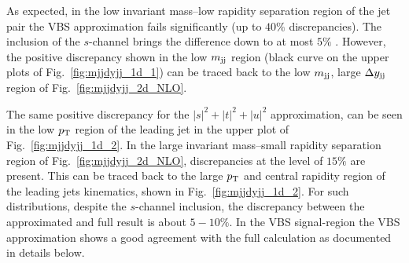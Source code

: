 As expected, in the low invariant mass--low rapidity separation region of the jet pair the VBS approximation fails significantly (up to $40\%$ discrepancies).
The inclusion of the $s$-channel brings the difference down to at most $5\%$ .
However, the positive discrepancy shown in the low $m_{\text{j}\text{j}}$ region (black curve on the upper plots of Fig.~\ref{fig:mjjdyjj_1d_1}) can be traced back to the low $m_{\text{j}\text{j}}$, large $\Delta y_{\text{j}\text{j}}$ region of Fig.~\ref{fig:mjjdyjj_2d_NLO}.
% 

The same positive discrepancy for the $|s|^2 + |t|^2 + |u|^2$ approximation, can be seen in the low $p_\text{T}$ region of the leading jet in the upper plot of Fig.~\ref{fig:mjjdyjj_1d_2}.
In the large invariant mass--small rapidity separation region of Fig.~\ref{fig:mjjdyjj_2d_NLO}, discrepancies at the level of $15\%$ are present.
This can be traced back to the large $p_\text{T}$ and central rapidity region of the leading jets kinematics, shown in Fig.~\ref{fig:mjjdyjj_1d_2}.
For such distributions, despite the $s$-channel inclusion, the discrepancy between the approximated and full result is about $5-10\%$.
In the VBS signal-region the VBS approximation shows a good agreement with the full calculation as documented in details below.

